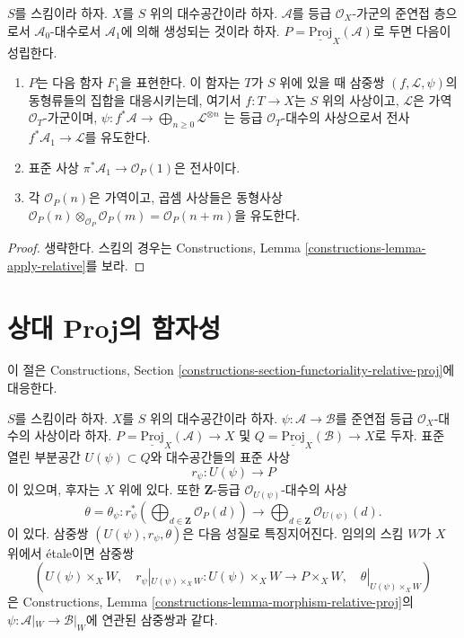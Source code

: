 \begin{lemma}
\label{lemma-relative-proj-generated-in-degree-1}
$S$를 스킴이라 하자. $X$를 $S$ 위의 대수공간이라 하자.
$\mathcal{A}$를 등급 $\mathcal{O}_X$-가군의 준연접 층으로서
$\mathcal{A}_0$-대수로서 $\mathcal{A}_1$에 의해 생성되는 것이라 하자.
$P = \underline{\text{Proj}}_X(\mathcal{A})$로 두면 다음이 성립한다.
\begin{enumerate}
\item $P$는 다음 함자 $F_1$을 표현한다. 이 함자는 $T$가 $S$ 위에 있을 때
삼중쌍 $(f, \mathcal{L}, \psi)$의 동형류들의 집합을 대응시키는데, 여기서
$f : T \to X$는 $S$ 위의 사상이고, $\mathcal{L}$은 가역
$\mathcal{O}_T$-가군이며,
$\psi : f^*\mathcal{A} \to \bigoplus_{n \geq 0} \mathcal{L}^{\otimes n}$
는 등급 $\mathcal{O}_T$-대수의 사상으로서 전사
$f^*\mathcal{A}_1 \to \mathcal{L}$를 유도한다.
\item 표준 사상 $\pi^*\mathcal{A}_1 \to \mathcal{O}_P(1)$은 전사이다.
\item 각 $\mathcal{O}_P(n)$은 가역이고, 곱셈 사상들은 동형사상
$\mathcal{O}_P(n) \otimes_{\mathcal{O}_P} \mathcal{O}_P(m) =
\mathcal{O}_P(n + m)$을 유도한다.
\end{enumerate}
\end{lemma}

\begin{proof}
생략한다. 스킴의 경우는 Constructions, Lemma
\ref{constructions-lemma-apply-relative}를 보라.
\end{proof}

\section{상대 Proj의 함자성}
\label{section-functoriality-relative-proj}

\noindent
이 절은 Constructions, Section
\ref{constructions-section-functoriality-relative-proj}에 대응한다.

\begin{lemma}
\label{lemma-morphism-relative-proj}
$S$를 스킴이라 하자. $X$를 $S$ 위의 대수공간이라 하자.
$\psi : \mathcal{A} \to \mathcal{B}$를 준연접 등급
$\mathcal{O}_X$-대수의 사상이라 하자.
$P = \underline{\text{Proj}}_X(\mathcal{A}) \to X$ 및
$Q = \underline{\text{Proj}}_X(\mathcal{B}) \to X$로 두자.
표준 열린 부분공간 $U(\psi) \subset Q$와 대수공간들의 표준 사상
$$
r_\psi :
U(\psi)
\longrightarrow
P
$$
이 있으며, 후자는 $X$ 위에 있다. 또한 $\mathbf{Z}$-등급
$\mathcal{O}_{U(\psi)}$-대수의 사상
$$
\theta = \theta_\psi :
r_\psi^*\left(
\bigoplus\nolimits_{d \in \mathbf{Z}} \mathcal{O}_P(d)
\right)
\longrightarrow
\bigoplus\nolimits_{d \in \mathbf{Z}} \mathcal{O}_{U(\psi)}(d).
$$
이 있다. 삼중쌍 $(U(\psi), r_\psi, \theta)$은 다음 성질로 특징지어진다.
임의의 스킴 $W$가 $X$ 위에서 \'etale이면 삼중쌍
$$
(U(\psi) \times_X W,\quad
r_\psi|_{U(\psi) \times_X W} : U(\psi) \times_X W \to  P \times_X W,\quad
\theta|_{U(\psi) \times_X W})
$$
은 Constructions, Lemma
\ref{constructions-lemma-morphism-relative-proj}의
$\psi : \mathcal{A}|_W \to \mathcal{B}|_W$에 연관된 삼중쌍과 같다.
\end{lemma}

